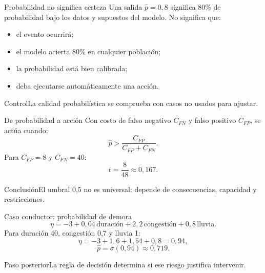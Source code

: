 \documentclass[aspectratio=169,10pt]{beamer}
\begin{document}
\begin{frame}{Probabilidad no significa certeza}
  \small
  Una salida $\widehat p=0{,}8$ significa 80\% de probabilidad bajo los datos y supuestos del modelo. No significa que:
  \begin{itemize}
    \item el evento ocurrirá;
    \item el modelo acierta 80\% en cualquier población;
    \item la probabilidad está bien calibrada;
    \item deba ejecutarse automáticamente una acción.
  \end{itemize}
  \begin{block}{Control}La calidad probabilística se comprueba con casos no usados para ajustar.\end{block}
\end{frame}

\begin{frame}{De probabilidad a acción}
  \small
  Con costo de falso negativo $C_{FN}$ y falso positivo $C_{FP}$, se actúa cuando:
  \[\widehat p>\frac{C_{FP}}{C_{FP}+C_{FN}}.\]
  Para $C_{FP}=8$ y $C_{FN}=40$:
  \[t=\frac{8}{48}\approx0{,}167.\]
  \begin{alertblock}{Conclusión}El umbral 0,5 no es universal: depende de consecuencias, capacidad y restricciones.\end{alertblock}
\end{frame}

\begin{frame}{Caso conductor: probabilidad de demora}
  \small
  \[\eta=-3+0{,}04\,\text{duración}+2{,}2\,\text{congestión}+0{,}8\,\text{lluvia}.\]
  Para duración 40, congestión 0,7 y lluvia 1:
  \[\eta=-3+1{,}6+1{,}54+0{,}8=0{,}94,\]
  \[\widehat p=\sigma(0{,}94)\approx0{,}719.\]
  \begin{block}{Paso posterior}La regla de decisión determina si ese riesgo justifica intervenir.\end{block}
\end{frame}
\end{document}
